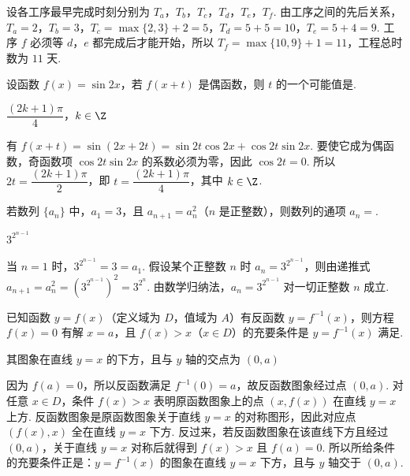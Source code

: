 \begin{solution}
设各工序最早完成时刻分别为 \(T_a\)，\(T_b\)，\(T_c\)，\(T_d\)，\(T_e\)，\(T_f\). 由工序之间的先后关系，\(T_a=2\)，\(T_b=3\)，\(T_c=\max\{2,3\}+2=5\)，\(T_d=5+5=10\)，\(T_e=5+4=9\). 工序 \(f\) 必须等 \(d\)，\(e\) 都完成后才能开始，所以 \(T_f=\max\{10,9\}+1=11\)，工程总时数为 \(11\text{ 天}\).
\end{solution}

\begin{problem}
设函数 \(f(x)=\sin 2x\)，若 \(f(x+t)\) 是偶函数，则 \(t\) 的一个可能值是\fillinblank{}.
\end{problem}

\begin{answer}
\(\dfrac{(2k+1)\pi}{4}\)，\(k\in\Z\)
\end{answer}

\begin{solution}
有 \(f(x+t)=\sin(2x+2t)=\sin2t\cos2x+\cos2t\sin2x\). 要使它成为偶函数，奇函数项 \(\cos2t\sin2x\) 的系数必须为零，因此 \(\cos2t=0\). 所以 \(2t=\dfrac{(2k+1)\pi}{2}\)，即 \(t=\dfrac{(2k+1)\pi}{4}\)，其中 \(k\in\Z\).
\end{solution}

\begin{problem}
若数列 \(\{a_n\}\) 中，\(a_1 = 3\)，且 \(a_{n+1} = a_{n}^{2}\)（\(n\) 是正整数），则数列的通项 \(a_n=\)\fillinblank{}.
\end{problem}

\begin{answer}
\(3^{2^{n-1}}\)
\end{answer}

\begin{solution}
当 \(n=1\) 时，\(3^{2^{n-1}}=3=a_1\). 假设某个正整数 \(n\) 时 \(a_n=3^{2^{n-1}}\)，则由递推式 \(a_{n+1}=a_n^2=\left(3^{2^{n-1}}\right)^2=3^{2^n}\). 由数学归纳法，\(a_n=3^{2^{n-1}}\) 对一切正整数 \(n\) 成立.
\end{solution}

\begin{problem}
已知函数 \(y = f(x)\)（定义域为 \(D\)，值域为 \(A\)）有反函数 \(y = f^{-1}(x)\)，则方程 \(f(x)=0\) 有解 \(x=a\)，且 \(f(x)>x\)（\(x \in D\)）的充要条件是 \(y = f^{-1}(x)\) 满足\fillinblank{}.
\end{problem}

\begin{answer}
其图象在直线 \(y=x\) 的下方，且与 \(y\) 轴的交点为 \((0,a)\)
\end{answer}

\begin{solution}
因为 \(f(a)=0\)，所以反函数满足 \(f^{-1}(0)=a\)，故反函数图象经过点 \((0,a)\). 对任意 \(x\in D\)，条件 \(f(x)>x\) 表明原函数图象上的点 \((x,f(x))\) 在直线 \(y=x\) 上方. 反函数图象是原函数图象关于直线 \(y=x\) 的对称图形，因此对应点 \((f(x),x)\) 全在直线 \(y=x\) 下方. 反过来，若反函数图象在该直线下方且经过 \((0,a)\)，关于直线 \(y=x\) 对称后就得到 \(f(x)>x\) 且 \(f(a)=0\). 所以所给条件的充要条件正是：\(y=f^{-1}(x)\) 的图象在直线 \(y=x\) 下方，且与 \(y\) 轴交于 \((0,a)\).
\end{solution}

